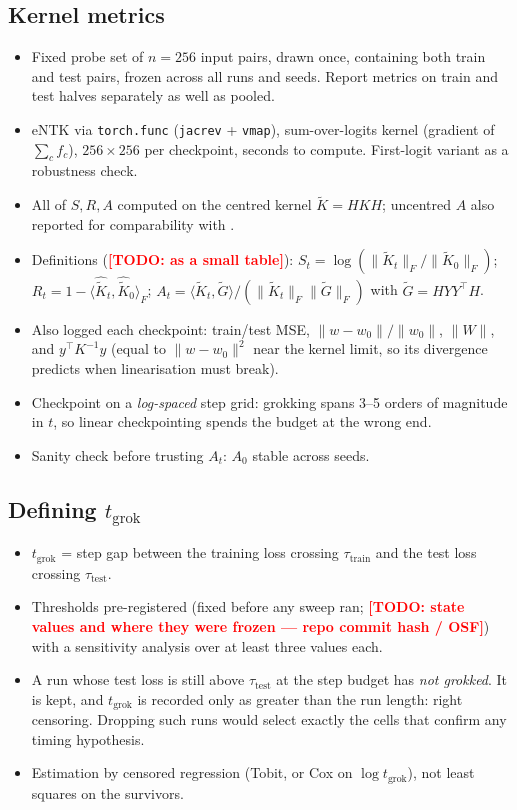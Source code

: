 \documentclass[a4paper,11pt]{article} %
\newcommand{\TODO}[1]{\textcolor{red}{\textbf{[TODO: #1]}}}
\newcommand{\Kt}{\widetilde{K}}
\newcommand{\Fnorm}[1]{\lVert #1 \rVert_F}
\newcommand{\tgrok}{t_{\mathrm{grok}}}
\begin{document}
\subsection{Kernel metrics}
\begin{itemize}
	\item Fixed probe set of $n=256$ input pairs, drawn once, containing both
		train and test pairs, frozen across all runs and seeds. Report metrics on
		train and test halves separately as well as pooled.
	\item eNTK via \texttt{torch.func} (\texttt{jacrev} + \texttt{vmap}),
		sum-over-logits kernel (gradient of $\sum_c f_c$), $256\times256$ per
		checkpoint, seconds to compute. First-logit variant as a robustness check.
	\item All of $S,R,A$ computed on the centred kernel $\Kt=HKH$; uncentred $A$
		also reported for comparability with \citet{kumar2024grokking}.
	\item Definitions (\TODO{as a small table}): $S_t=\log(\Fnorm{\Kt_t}/\Fnorm{\Kt_0})$;
		$R_t=1-\langle\widehat{\Kt}_t,\widehat{\Kt}_0\rangle_F$;
		$A_t=\langle\Kt_t,\widetilde G\rangle/(\Fnorm{\Kt_t}\Fnorm{\widetilde G})$
		with $\widetilde G=HYY^\top H$.
	\item Also logged each checkpoint: train/test MSE, $\lVert w-w_0\rVert/\lVert
		w_0\rVert$, $\lVert W\rVert$, and $y^\top K^{-1}y$ (equal to
		$\lVert w-w_0\rVert^2$ near the kernel limit, so its divergence predicts
		when linearisation must break).
	\item Checkpoint on a \emph{log-spaced} step grid: grokking spans 3--5 orders
		of magnitude in $t$, so linear checkpointing spends the budget at the wrong
		end.
	\item Sanity check before trusting $A_t$: $A_0$ stable across seeds.
\end{itemize}

\subsection{Defining $\tgrok$}
\begin{itemize}
	\item $\tgrok$ = step gap between the training loss crossing
		$\tau_{\mathrm{train}}$ and the test loss crossing $\tau_{\mathrm{test}}$.
	\item Thresholds pre-registered (fixed before any sweep ran; \TODO{state
		values and where they were frozen --- repo commit hash / OSF}) with a
		sensitivity analysis over at least three values each.
	\item A run whose test loss is still above $\tau_{\mathrm{test}}$ at the step
		budget has \emph{not grokked}. It is kept, and $\tgrok$ is recorded only as
		greater than the run length: right censoring. Dropping such runs would select
		exactly the cells that confirm any timing hypothesis.
	\item Estimation by censored regression (Tobit, or Cox on $\log\tgrok$), not
		least squares on the survivors.
\end{itemize}
\end{document}
